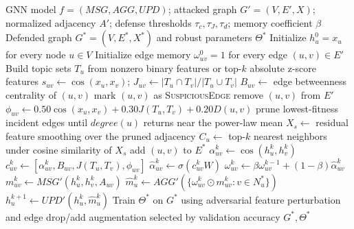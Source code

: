 \begin{algorithm}[H]
\caption{STRUC-GUARD+ with Ontology-Driven Self-Healing}
\label{alg:struc-guard-plus}
\begin{algorithmic}[1]
\Require GNN model $f=(MSG,AGG,UPD)$; attacked graph $G'=(V,E',X)$; normalized adjacency $A'$; defense thresholds $\tau_c,\tau_J,\tau_d$; memory coefficient $\beta$
\Ensure Defended graph $G^*=(V,E^*,X^*)$ and robust parameters $\Theta^*$
\State Initialize $h_u^0=x_u$ for every node $u\in V$
\State Initialize edge memory $\omega_{uv}^0=1$ for every edge $(u,v)\in E'$
\State Build topic sets $T_u$ from nonzero binary features or top-$k$ absolute z-score features
    \State $s_{uv}\gets \cos(x_u,x_v)$; \quad $J_{uv}\gets |T_u\cap T_v|/|T_u\cup T_v|$
    \State $B_{uv}\gets$ edge betweenness centrality of $(u,v)$
        \State mark $(u,v)$ as \textsc{SuspiciousEdge}
    \EndIf
\EndFor
{}
        \State remove $(u,v)$ from $E'$
    \EndIf
\EndFor
{}
        \State $\phi_{uv}\gets0.50\cos(x_u,x_v)+0.30J(T_u,T_v)+0.20D(u,v)$
    \EndFor
    \State prune lowest-fitness incident edges until $degree(u)$ returns near the power-law mean
\EndFor
\State $X_s\gets$ residual feature smoothing over the pruned adjacency
    \State $C_u\gets$ top-$k$ nearest neighbors under cosine similarity of $X_s$
            \State add $(u,v)$ to $E^*$
        \EndIf
    \EndFor
\EndFor
{}
            \State $\alpha_{uv}^k\gets\cos(h_u^k,h_v^k)$
            \State $c_{uv}^k\gets[\alpha_{uv}^k,B_{uv},J(T_u,T_v),\phi_{uv}]$
            \State $\hat{\alpha}_{uv}^k\gets\sigma(c_{uv}^kW)$
            \State $\omega_{uv}^k\gets\beta\omega_{uv}^{k-1}+(1-\beta)\hat{\alpha}_{uv}^k$
            \State $m_{uv}^k\gets MSG'(h_u^k,h_v^k,A_{uv})$
        \EndFor
        \State $\hat{m}_u^k\gets AGG'(\{\omega_{uv}^k\odot m_{uv}^k:v\in N_u^*\})$
        \State $h_u^{k+1}\gets UPD'(h_u^k,\hat{m}_u^k)$
    \EndFor
\EndFor
\State Train $\Theta^*$ on $G^*$ using adversarial feature perturbation and edge drop/add augmentation selected by validation accuracy
\State \Return $G^*,\Theta^*$
\end{algorithmic}
\end{algorithm}
